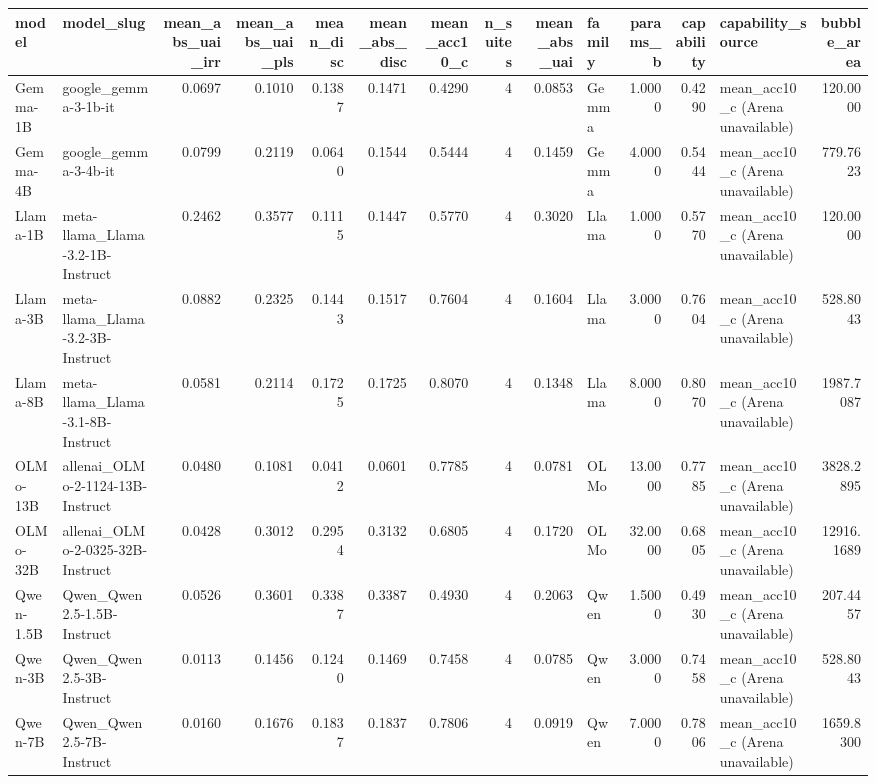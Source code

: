\begin{tabular}{llrrrrrrrlrrlr}
\toprule
model & model_slug & mean_abs_uai_irr & mean_abs_uai_pls & mean_disc & mean_abs_disc & mean_acc10_c & n_suites & mean_abs_uai & family & params_b & capability & capability_source & bubble_area \\
\midrule
Gemma-1B & google_gemma-3-1b-it & 0.0697 & 0.1010 & 0.1387 & 0.1471 & 0.4290 & 4 & 0.0853 & Gemma & 1.0000 & 0.4290 & mean_acc10_c (Arena unavailable) & 120.0000 \\
Gemma-4B & google_gemma-3-4b-it & 0.0799 & 0.2119 & 0.0640 & 0.1544 & 0.5444 & 4 & 0.1459 & Gemma & 4.0000 & 0.5444 & mean_acc10_c (Arena unavailable) & 779.7623 \\
Llama-1B & meta-llama_Llama-3.2-1B-Instruct & 0.2462 & 0.3577 & 0.1115 & 0.1447 & 0.5770 & 4 & 0.3020 & Llama & 1.0000 & 0.5770 & mean_acc10_c (Arena unavailable) & 120.0000 \\
Llama-3B & meta-llama_Llama-3.2-3B-Instruct & 0.0882 & 0.2325 & 0.1443 & 0.1517 & 0.7604 & 4 & 0.1604 & Llama & 3.0000 & 0.7604 & mean_acc10_c (Arena unavailable) & 528.8043 \\
Llama-8B & meta-llama_Llama-3.1-8B-Instruct & 0.0581 & 0.2114 & 0.1725 & 0.1725 & 0.8070 & 4 & 0.1348 & Llama & 8.0000 & 0.8070 & mean_acc10_c (Arena unavailable) & 1987.7087 \\
OLMo-13B & allenai_OLMo-2-1124-13B-Instruct & 0.0480 & 0.1081 & 0.0412 & 0.0601 & 0.7785 & 4 & 0.0781 & OLMo & 13.0000 & 0.7785 & mean_acc10_c (Arena unavailable) & 3828.2895 \\
OLMo-32B & allenai_OLMo-2-0325-32B-Instruct & 0.0428 & 0.3012 & 0.2954 & 0.3132 & 0.6805 & 4 & 0.1720 & OLMo & 32.0000 & 0.6805 & mean_acc10_c (Arena unavailable) & 12916.1689 \\
Qwen-1.5B & Qwen_Qwen2.5-1.5B-Instruct & 0.0526 & 0.3601 & 0.3387 & 0.3387 & 0.4930 & 4 & 0.2063 & Qwen & 1.5000 & 0.4930 & mean_acc10_c (Arena unavailable) & 207.4457 \\
Qwen-3B & Qwen_Qwen2.5-3B-Instruct & 0.0113 & 0.1456 & 0.1240 & 0.1469 & 0.7458 & 4 & 0.0785 & Qwen & 3.0000 & 0.7458 & mean_acc10_c (Arena unavailable) & 528.8043 \\
Qwen-7B & Qwen_Qwen2.5-7B-Instruct & 0.0160 & 0.1676 & 0.1837 & 0.1837 & 0.7806 & 4 & 0.0919 & Qwen & 7.0000 & 0.7806 & mean_acc10_c (Arena unavailable) & 1659.8300 \\
\bottomrule
\end{tabular}
